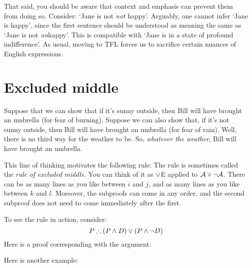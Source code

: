 That said, you should be aware that context and emphasis can prevent them from doing so. Consider: `Jane is not \emph{not} happy'. Arguably, one cannot infer `Jane is happy', since the first sentence should be understood as meaning the same as  `Jane is not \emph{un}happy'. This is compatible with `Jane is in a state of profound indifference'. As usual, moving to TFL forces us to sacrifice certain nuances of English expressions.

\section{Excluded middle}

Suppose that we can show that if it's sunny outside, then Bill will have brought an umbrella (for fear of burning). Suppose we can also show that, if it's not sunny outside, then Bill will have brought an umbrella (for fear of rain). Well, there is no third way for the weather to be. So, \emph{whatever the weather}, Bill will have brought an umbrella.

This line of thinking motivates the following rule:
The rule is sometimes called the \emph{rule of excluded middle}. You
can think of it as $\vee$E applied to $\mathcal{A} \vee \neg \mathcal{A}$.
There can be as many lines as you like between $i$ and $j$, and as
many lines as you like between $k$ and $l$. Moreover, the subproofs
can come in any order, and the second subproof does not need to come
immediately after the first.

To see the rule in action, consider:
	$$P \therefore (P \eand D) \eor (P \eand \enot D)$$
Here is a proof corresponding with the argument:
	\begin{fitchproof}
		\PR
		\open
			\AS
		\close
		\open
			\AS
		\close
	\end{fitchproof}
Here is another example:
\begin{fitchproof}
	\PR
	\open
		\hypo{a}{A}\AS
		\ce{ana, a}
	\close
	\open
		\hypo{na1}{\enot A}\AS
		\by{R}{na1}
	\close
	\tnd{a-na, na1-na2}
\end{fitchproof}


